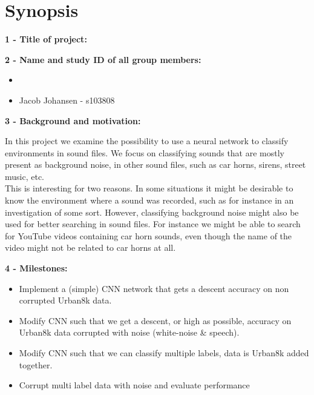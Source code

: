 \documentclass[times,12pt]{article}    %
\begin{document}
\section*{Synopsis}

\noindent \textbf{1 - Title of project:}
\noindent 

\noindent \textbf{2 - Name and study ID of all group members:}
\begin{itemize}
\item  
\item Jacob Johansen - s103808
\end{itemize}

\noindent \textbf{3 - Background and motivation:}

\noindent In this project we examine the possibility to use a neural network to classify environments in sound files. We focus on classifying sounds that are mostly present as background noise, in other sound files, such as car horns, sirens, street music, etc.\\
This is interesting for two reasons. In some situations it might be desirable to know the environment where a sound was recorded, such as for instance in an investigation of some sort. However, classifying background noise might also be used for better searching in sound files. For instance we might be able to search for YouTube videos containing car horn sounds, even though the name of the video might not be related to car horns at all.

\noindent \textbf{4 - Milestones:}

\begin{itemize}
\item Implement a (simple) CNN network that gets a descent accuracy on non corrupted Urban8k data.
\item Modify CNN such that we get a descent, or high as possible, accuracy on Urban8k data corrupted with noise (white-noise \& speech).
\item Modify CNN such that we can classify multiple labels, data is Urban8k added together.
\item Corrupt multi label data with noise and evaluate performance
\end{itemize}
\end{document}
